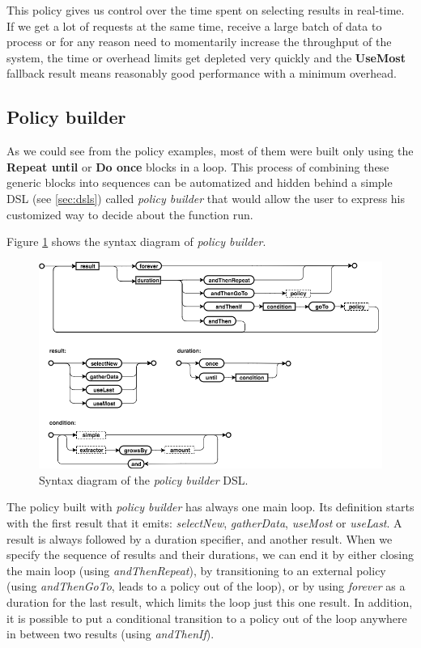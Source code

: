 This policy gives us control over the time spent on selecting results in real-time. If we get a lot of requests at the same time, receive a large batch of data to process or for any reason need to momentarily increase the throughput of the system, the time or overhead limits get depleted very quickly and the \textbf{UseMost} fallback result means reasonably good performance with a minimum overhead.

\subsection{Policy builder}

As we could see from the policy examples, most of them were built only using the \textbf{Repeat until} or \textbf{Do once} blocks in a loop. This process of combining these generic blocks into sequences can be automatized and hidden behind a simple DSL (see \ref{sec:dsls}) called \textit{policy builder} that would allow the user to express his customized way to decide about the function run.

Figure \ref{fig:policy_builder_chart} shows the syntax diagram of \textit{policy builder}.

\begin{figure}[h!]
	\captionsetup{justification=centering,margin=0.5cm}
	\centerline{\mbox{\includegraphics[width=140mm]{./img/policy_builder_chart.png}}}
	\caption{Syntax diagram of the \textit{policy builder} DSL.}
	\label{fig:policy_builder_chart}
\end{figure}

The policy built with \textit{policy builder} has always one main loop. Its definition starts with the first result that it emits: \textit{selectNew}, \textit{gatherData}, \textit{useMost} or \textit{useLast}. A result is always followed by a duration specifier, and another result. When we specify the sequence of results and their durations, we can end it by either closing the main loop (using \textit{andThenRepeat}), by transitioning to an external policy (using \textit{andThenGoTo}, leads to a policy out of the loop), or by using \textit{forever} as a duration for the last result, which limits the loop just this one result. In addition, it is possible to put a conditional transition to a policy out of the loop anywhere in between two results (using \textit{andThenIf}).

